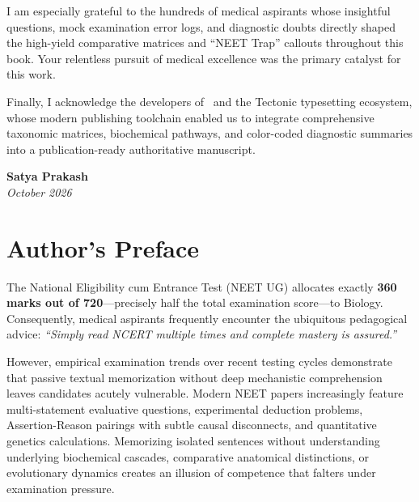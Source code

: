 \documentclass[10pt,twoside,openright]{book}
\begin{document}
I am especially grateful to the hundreds of medical aspirants whose insightful questions, mock examination error logs, and diagnostic doubts directly shaped the high-yield comparative matrices and ``NEET Trap'' callouts throughout this book. Your relentless pursuit of medical excellence was the primary catalyst for this work.

Finally, I acknowledge the developers of \LaTeXe\ and the Tectonic typesetting ecosystem, whose modern publishing toolchain enabled us to integrate comprehensive taxonomic matrices, biochemical pathways, and color-coded diagnostic summaries into a publication-ready authoritative manuscript.

\vspace{1cm}
\begin{flushright}
  \textbf{Satya Prakash}\\
  \textit{October 2026}
\end{flushright}
\cleardoublepage

\chapter*{Author's Preface}

The National Eligibility cum Entrance Test (NEET UG) allocates exactly \textbf{360 marks out of 720}---precisely half the total examination score---to Biology. Consequently, medical aspirants frequently encounter the ubiquitous pedagogical advice: \textit{``Simply read NCERT multiple times and complete mastery is assured.''}

However, empirical examination trends over recent testing cycles demonstrate that passive textual memorization without deep mechanistic comprehension leaves candidates acutely vulnerable. Modern NEET papers increasingly feature multi-statement evaluative questions, experimental deduction problems, Assertion-Reason pairings with subtle causal disconnects, and quantitative genetics calculations. Memorizing isolated sentences without understanding underlying biochemical cascades, comparative anatomical distinctions, or evolutionary dynamics creates an illusion of competence that falters under examination pressure.
\end{document}
